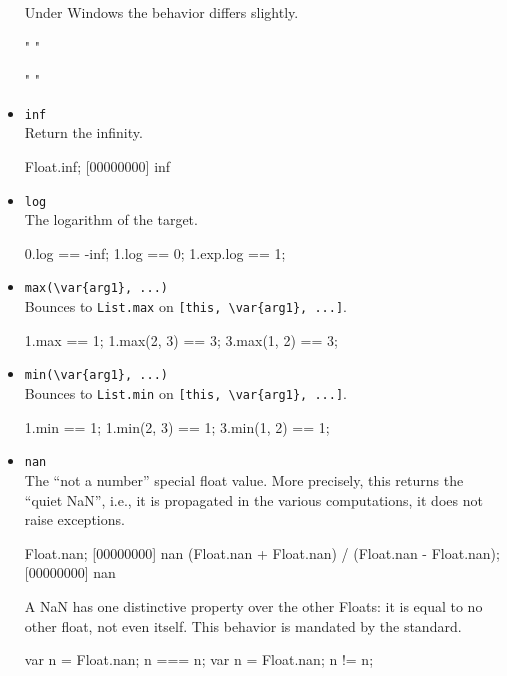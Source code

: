 \begin{itemize}
  \begin{windows}
    Under Windows the behavior differs slightly.
  \end{windows}
\begin{urbiassert}[firstnumber=last]
"%
"%

"%
"%
\end{urbiassert}

\item \lstinline|inf|\\
  Return the infinity.
\begin{urbiscript}[firstnumber=last]
Float.inf;
[00000000] inf
\end{urbiscript}

\item \lstinline|log|\\
  The logarithm of the target.
\begin{urbiassert}[firstnumber=last]
0.log == -inf;
1.log == 0;
1.exp.log == 1;
\end{urbiassert}

\item \lstinline|max(\var{arg1}, ...)|\\
  Bounces to \lstinline|List.max| on \lstinline|[this, \var{arg1}, ...]|.
\begin{urbiassert}[firstnumber=last]
1.max == 1;
1.max(2, 3) == 3;
3.max(1, 2) == 3;
\end{urbiassert}

\item \lstinline|min(\var{arg1}, ...)|\\
  Bounces to \lstinline|List.min| on \lstinline|[this, \var{arg1}, ...]|.
\begin{urbiassert}[firstnumber=last]
1.min == 1;
1.min(2, 3) == 1;
3.min(1, 2) == 1;
\end{urbiassert}

\item \lstinline|nan|\\
  The ``not a number'' special float value.  More precisely, this
  returns the ``quiet NaN'', i.e., it is propagated in the various
  computations, it does not raise exceptions.
\begin{urbiscript}[firstnumber=last]
Float.nan;
[00000000] nan
(Float.nan + Float.nan) / (Float.nan - Float.nan);
[00000000] nan
\end{urbiscript}

A {NaN} has one distinctive property over the other Floats: it is
equal to no other float, not even itself.  This behavior is mandated
by the  standard.
\begin{urbiassert}[firstnumber=last]
{ var n = Float.nan; n === n};
{ var n = Float.nan; n  != n};
\end{urbiassert}


\end{itemize}
